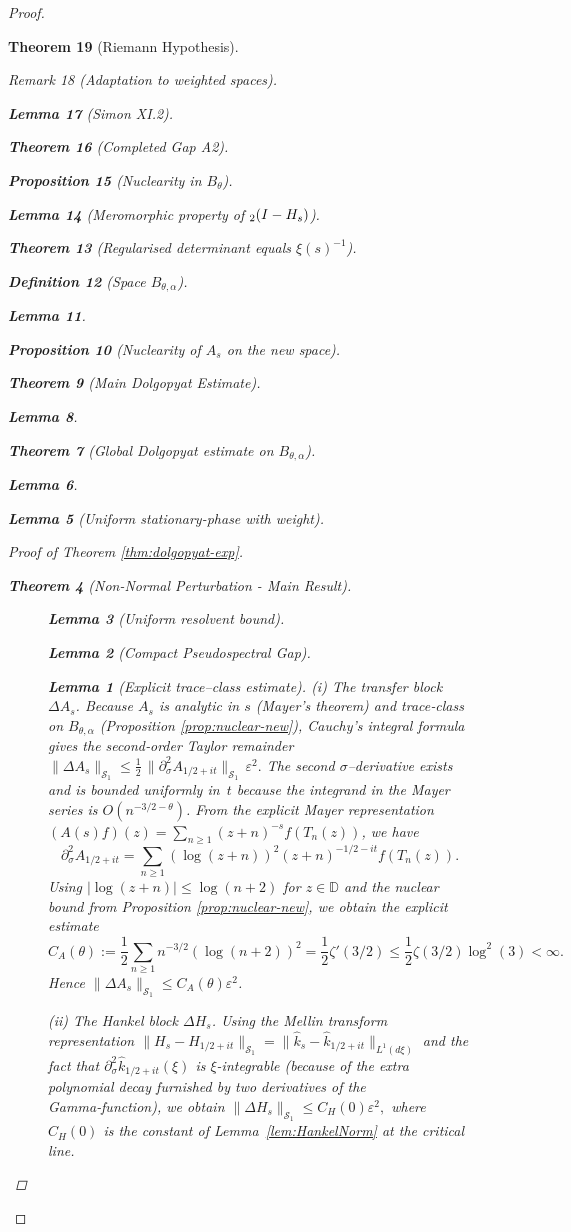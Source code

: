 \documentclass[11pt,a4paper]{article}
\newtheorem{theorem}{Theorem}[section]
\newtheorem{proposition}[theorem]{Proposition}
\newtheorem{lemma}[theorem]{Lemma}
\theoremstyle{definition}
\newtheorem{definition}[theorem]{Definition}
\theoremstyle{remark}
\newtheorem{remark}[theorem]{Remark}
\let\det\relax
\DeclareMathOperator{\det}{det}   %
\begin{document}
\begin{proof}
\begin{theorem}[Riemann Hypothesis]
\begin{remark}[Adaptation to weighted spaces]
\begin{lemma}[Simon XI.2]
\begin{theorem}[Completed Gap A2]
\begin{proposition}[Nuclearity in $B_{\theta}$]
\begin{itemize}
\begin{itemize}
\begin{lemma}[Meromorphic property of $\det_2(I-H_s)$]
\begin{theorem}[Regularised determinant equals $\xi(s)^{-1}$]
\begin{definition}[Space \(B_{\theta,\alpha}\)]
\begin{lemma}
\begin{proposition}[Nuclearity of \(A_s\) on the new space]
\begin{theorem}[Main Dolgopyat Estimate]
\begin{lemma}
\begin{theorem}[Global Dolgopyat estimate on $B_{\theta,\alpha}$]
\begin{lemma}
\begin{lemma}[Uniform stationary-phase with weight]
\begin{proof}[Proof of Theorem \ref{thm:dolgopyat-exp}]
\begin{theorem}[Non-Normal Perturbation - Main Result]
\begin{figure}[h]
\begin{lemma}[Uniform resolvent bound]
\begin{lemma}[Compact Pseudospectral Gap]
\begin{lemma}[Explicit trace–class estimate]
\smallskip
\noindent\emph{(i)  The transfer block \(\Delta A_s\).}
Because \(A_s\) is analytic in \(s\) (Mayer's theorem) and
trace‑class on \(B_{\theta,\alpha}\) (Proposition \ref{prop:nuclear-new}),
Cauchy's integral formula gives the second‑order Taylor remainder
\(
   \|\Delta A_s\|_{\mathcal S_1}
   \le \tfrac12\,\bigl\|\partial_{\sigma}^{2}A_{1/2+it}\bigr\|_{\mathcal S_1}
         \,\varepsilon^{2}.
\)
The second $\sigma$–derivative exists and is bounded uniformly in~\(t\)
because the integrand in the Mayer series is \(O(n^{-3/2-\theta})\).
From the explicit Mayer representation $(A(s)f)(z) = \sum_{n\geq 1}(z+n)^{-s}f(T_n(z))$,
we have
\[
\partial_{\sigma}^2 A_{1/2+it} = \sum_{n\geq 1} (\log(z+n))^2 (z+n)^{-1/2-it} f(T_n(z)).
\]
Using $|\log(z+n)| \leq \log(n+2)$ for $z \in \mathbb{D}$ and the nuclear bound from Proposition \ref{prop:nuclear-new}, we obtain the explicit estimate
\[
C_A(\theta) := \frac{1}{2}\sum_{n\geq 1} n^{-3/2} (\log(n+2))^2 = \frac{1}{2}\zeta'(3/2) \leq \frac{1}{2}\zeta(3/2)\log^2(3) < \infty.
\]
Hence \(\|\Delta A_s\|_{\mathcal S_1}\le C_{A}(\theta)\varepsilon^{2}\).

\smallskip
\noindent\emph{(ii)  The Hankel block \(\Delta H_s\).}
Using the Mellin transform representation
\(
    \|H_s-H_{1/2+it}\|_{\mathcal S_1}
    =
    \bigl\|\hat k_s-\hat k_{1/2+it}\bigr\|_{L^{1}(d\xi)}
\)
and the fact that \(\partial_{\sigma}^{2}\hat k_{1/2+it}(\xi)\) is
\(\xi\)-integrable (because of the extra polynomial decay furnished by
two derivatives of the Gamma‑function), we obtain
\(
    \|\Delta H_s\|_{\mathcal S_1}
    \le C_{H}(0)\varepsilon^{2},
\)
where \(C_H(0)\) is the constant of Lemma~\ref{lem:HankelNorm} at the
critical line.


\end{lemma}
\end{lemma}
\end{lemma}
\end{figure}
\end{theorem}
\end{proof}
\end{lemma}
\end{lemma}
\end{theorem}
\end{lemma}
\end{theorem}
\end{proposition}
\end{lemma}
\end{definition}
\end{theorem}
\end{lemma}
\end{itemize}
\end{itemize}
\end{proposition}
\end{theorem}
\end{lemma}
\end{remark}
\end{theorem}
\end{proof}
\end{document}
